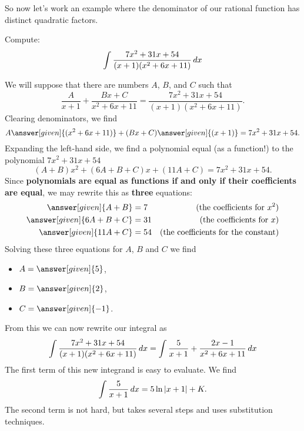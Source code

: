 \documentclass{ximera}
\begin{document}
So now let's work an example where the denominator of our rational
function has distinct quadratic factors.

\begin{example}
  Compute:
  \[
  \int\frac{7x^2+31x+54}{(x+1)(x^2+6x+11)}\mathop{}\!d x
  \]
  \begin{explanation}
    We will suppose that there are numbers $A$, $B$, and $C$ such that
    \[
    \frac{A}{x+1} + \frac{Bx+C}{x^2+6x+11} = \frac{7x^2+31x+54}{(x+1)(x^2+6x+11)}.
    \]
    Clearing denominators, we find
    \[
    A\answer[given]{(x^2+6x+11)} + (Bx+C)\answer[given]{(x+1)} = 7x^2+31x+54.
    \]
    Expanding the left-hand side, we find a polynomial equal (as a
    function!) to the polynomial $7x^2+31x+54$
    \[
    (A+B)x^2 + (6A+B+C)x + (11A+C) = 7x^2+31x+54.
    \]
    Since \textbf{polynomials are equal as functions if and only if
      their coefficients are equal}, we may rewrite this as
    \textbf{three} equations:
    \begin{align*}
      \answer[given]{A+B} &= 7 &\text{(the coefficients for $x^2$)}\\
      \answer[given]{6A+B+C} &= 31 &\text{(the coefficients for $x$)}\\
      \answer[given]{11A+C} &= 54 &\text{(the coefficients for the constant)}
    \end{align*}
    Solving these three equations for $A$, $B$ and $C$ we find
    \begin{itemize}
    \item $A = \answer[given]{5}$,
    \item $B = \answer[given]{2}$,
    \item $C = \answer[given]{-1}$.
    \end{itemize}
    From this we can now rewrite our integral as
    \[
    \int\frac{7x^2+31x+54}{(x+1)(x^2+6x+11)}\mathop{}\!d x = \int\frac{5}{x+1} + \frac{2x-1}{x^2+6x+11} \mathop{}\!d x\\
    \]
    The first term of this new integrand is easy to evaluate. We find
    \[
    \int \frac{5}{x+1} \mathop{}\!d x = 5\ln|x+1|+K.
    \]
    The second term is not hard, but takes several steps and uses
    substitution techniques.


\end{explanation}
\end{example}
\end{document}
